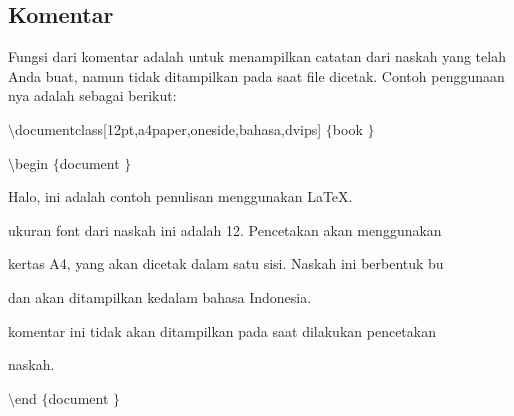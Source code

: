 \subsection{Komentar}
 \par
\hspace{0.50in} Fungsi dari komentar adalah untuk menampilkan catatan dari naskah yang telah Anda buat, namun tidak ditampilkan pada saat file dicetak. Contoh penggunaan nya adalah sebagai berikut:
 \par
{\fontsize{10pt}{10pt}\selectfont  $  \setminus  $documentclass[12pt,a4paper,oneside,bahasa,dvips] $  \{  $book $  \}  $}
 \par
{\fontsize{10pt}{10pt}\selectfont  $  \setminus  $begin $  \{  $document $  \}  $}
 \par
{\fontsize{10pt}{10pt}\selectfont Halo, ini adalah contoh penulisan menggunakan LaTeX.}
 \par
{\fontsize{10pt}{10pt}\selectfont ukuran font dari naskah ini adalah 12. Pencetakan akan menggunakan}
 \par
{\fontsize{10pt}{10pt}\selectfont kertas A4, yang akan dicetak dalam satu sisi. Naskah ini berbentuk bu}
 \par
{\fontsize{10pt}{10pt}\selectfont dan akan ditampilkan kedalam bahasa Indonesia.}
 \par
{\fontsize{10pt}{10pt}\selectfont komentar ini tidak akan ditampilkan pada saat dilakukan pencetakan}
 \par
{\fontsize{10pt}{10pt}\selectfont naskah.}
 \par
{\fontsize{10pt}{10pt}\selectfont  $  \setminus  $end $  \{  $document $  \}  $}
 \par
